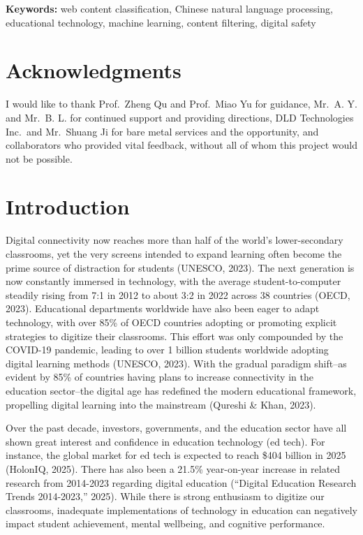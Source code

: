 \documentclass[
  titlepage]{article}
\begin{document}
\textbf{Keywords:} web content classification, Chinese natural language
processing, educational technology, machine learning, content filtering,
digital safety

\newpage

\section*{Acknowledgments}\label{acknowledgments}

I would like to thank Prof.~Zheng Qu and Prof.~Miao Yu for guidance,
Mr.~A. Y. and Mr.~B. L. for continued support and providing directions,
DLD Technologies Inc.~and Mr.~Shuang Ji for bare metal services and the
opportunity, and collaborators who provided vital feedback, without all
of whom this project would not be possible.

\section{Introduction}\label{introduction}

Digital connectivity now reaches more than half of the world's
lower-secondary classrooms, yet the very screens intended to expand
learning often become the prime source of distraction for students
(UNESCO, 2023). The next generation is now constantly immersed in
technology, with the average student-to-computer steadily rising from
7:1 in 2012 to about 3:2 in 2022 across 38 countries (OECD, 2023).
Educational departments worldwide have also been eager to adapt
technology, with over 85\% of OECD countries adopting or promoting
explicit strategies to digitize their classrooms. This effort was only
compounded by the COVID-19 pandemic, leading to over 1 billion students
worldwide adopting digital learning methods (UNESCO, 2023). With the
gradual paradigm shift--as evident by 85\% of countries having plans to
increase connectivity in the education sector--the digital age has
redefined the modern educational framework, propelling digital learning
into the mainstream (Qureshi \& Khan, 2023).

Over the past decade, investors, governments, and the education sector
have all shown great interest and confidence in education technology (ed
tech). For instance, the global market for ed tech is expected to reach
\$404 billion in 2025 (HolonIQ, 2025). There has also been a 21.5\%
year-on-year increase in related research from 2014-2023 regarding
digital education ({``Digital Education Research Trends 2014-2023,''}
2025). While there is strong enthusiasm to digitize our classrooms,
inadequate implementations of technology in education can negatively
impact student achievement, mental wellbeing, and cognitive performance.
\end{document}
